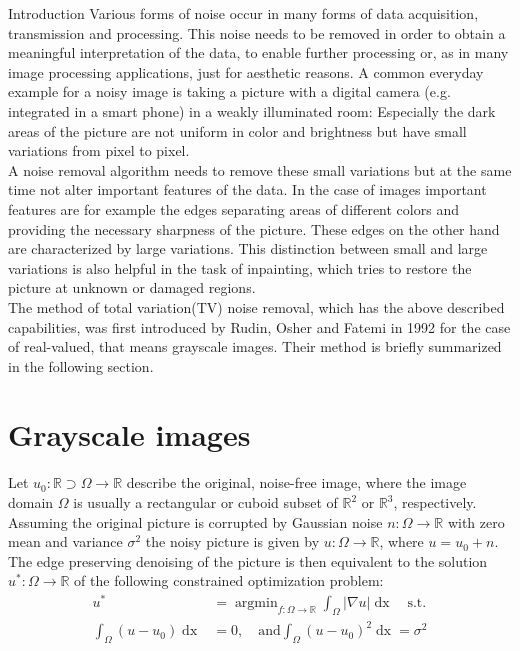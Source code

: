 \begin{chapter}{Introduction}
\label{ch:introduction}
Various forms of noise occur in many forms of data acquisition, transmission and processing.
This noise needs to be removed in order to obtain a meaningful interpretation of the data, to enable further processing or, as in many image processing 
applications, just for aesthetic reasons. A common everyday example for a noisy image is taking a picture with a digital camera (e.g. integrated in a smart phone) in a weakly illuminated room:
Especially the dark areas of the picture are not uniform in color and brightness but have small variations from pixel to pixel.\\

A noise removal algorithm needs to remove these small variations but at the same time not alter important features of the data. In the case of images important features are for example 
the edges separating areas of different colors and providing the necessary sharpness of the picture. These edges on the other hand are characterized by large variations. This distinction
between small and large variations is also helpful in the task of inpainting, which tries to restore the picture at unknown or damaged regions.\\

The method of total variation(TV) noise removal, which has the above described capabilities, was first introduced by Rudin, Osher and Fatemi \cite{RudinOsher} in 1992
for the case of real-valued, that means grayscale images. Their method is briefly summarized in the following section.

\section{Grayscale images}
Let $u_0:  \mathbb{R}\supset\Omega\to \mathbb{R}$ describe the original, noise-free image, where the image domain $\Omega$ is usually a rectangular or cuboid subset of $\mathbb{R}^2$ or $\mathbb{R}^3$, respectively. 
Assuming the original picture is corrupted by Gaussian noise $n: \Omega\to\mathbb{R}$ with zero mean and variance $\sigma^2$ the noisy picture is given by $u: \Omega\to \mathbb{R}$, where
$u = u_0 + n$. The edge preserving denoising of the picture is then equivalent to the solution $u^* :\Omega\to \mathbb{R}$ of the following constrained optimization problem:
\begin{align}
    \label{osher_opt}
    u^* &= \operatorname{argmin}_{f: \Omega\to \mathbb{R}}\int_\Omega\left\vert\nabla u\right\vert \mathop{dx} \quad\text{s.t.}\\
    \int_\Omega(u-u_0)\mathop{dx} &= 0, \quad\text{and} \int_\Omega(u-u_0)^2 \mathop{dx}= \sigma^2
\end{align}


\end{chapter}
